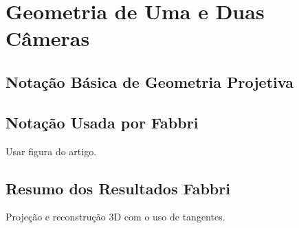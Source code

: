 \section{Geometria de Uma e Duas Câmeras}

\subsection{Notação Básica de Geometria Projetiva}

\subsection{Notação Usada por Fabbri}
Usar figura do artigo.

\subsection{Resumo dos Resultados Fabbri}
Projeção e reconstrução 3D com o uso de tangentes.
